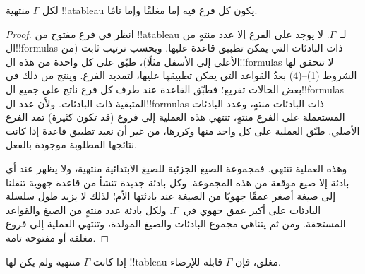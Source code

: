 \documentclass[../../../include/open-logic-section]{subfiles}
\begin{document}
\begin{prop}
  لكل $\Gamma$ منتهية !!a{tableau} يكون كل فرع فيه إما مغلقًا وإما تامًا.
\end{prop}

\begin{proof}
  انظر في فرع مفتوح من !!a{tableau} لـ~$\Gamma$. لا يوجد على الفرع
  إلا عدد منتهٍ من ال!!{formula}s ذات البادئات التي يمكن تطبيق قاعدة
  عليها. وبحسب ترتيب ثابت (من الأعلى إلى الأسفل مثلًا)، طبّق على كل
  واحدة من هذه ال!!{formula}s لا تتحقق لها الشروط (1)--(4) بعدُ
  القواعد التي يمكن تطبيقها عليها، لتمديد الفرع. وينتج من ذلك في بعض
  الحالات تفريع؛ فطبّق القاعدة عند طرف كل فرع ناتج على جميع
  ال!!{formula}s المتبقية ذات البادئات. ولأن عدد ال!!{formula}s ذات
  البادئات منتهٍ، وعدد البادئات المستعملة على الفرع منتهٍ، تنتهي هذه
  العملية إلى فروع (قد تكون كثيرة) تمد الفرع الأصلي. طبّق العملية على
  كل واحد منها وكررها، من غير أن نعيد تطبيق قاعدة إذا كانت نتائجها المطلوبة
  موجودة بالفعل.

  وهذه العملية تنتهي. فمجموعة الصيغ الجزئية للصيغ الابتدائية منتهية، ولا
  يظهر عند أي بادئة إلا صيغ موقعة من هذه المجموعة. وكل بادئة جديدة تنشأ من
  قاعدة جهوية تنقلنا إلى صيغة أصغر عمقًا جهويًا من الصيغة عند بادئتها الأم؛
  لذلك لا يزيد طول سلسلة البادئات على أكبر عمق جهوي في~$\Gamma$. ولكل بادئة
  عدد منتهٍ من الصيغ والقواعد المستحقة. ومن ثم يتناهى مجموع البادئات والصيغ
  المولدة، وتنتهي العملية إلى فروع مغلقة أو مفتوحة تامة.
\end{proof}

\begin{thm}[التمام]
  إذا كانت $\Gamma$ منتهية ولم يكن لها !!{tableau} مغلق، فإن $\Gamma$
  قابلة للإرضاء.
\end{thm}
\end{document}
